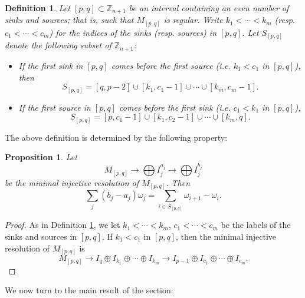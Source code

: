 \documentclass[12pt]{amsart}
\newcommand{\ZZ}{\mathbb{Z}}
\newtheorem{definition}[theorem]{Definition}
\newtheorem{proposition}[theorem]{Proposition}
\theoremstyle{remark}
\numberwithin{equation}{section}
\begin{document}
\begin{definition}\label{def:Spq}
Let $[p,q] \subset \ZZ_{n+1}$ be an interval containing an even number of sinks and sources; that is, such that $M_{[p,q]}$ is regular. Write $k_1 < \cdots < k_m$ (resp. $c_1 < \cdots < c_m$) for the indices of the sinks (resp. sources) in $[p,q]$. Let $S_{[p,q]}$ denote the following subset of $\ZZ_{n+1}$:
\begin{itemize}
\item If the first sink in $[p,q]$ comes before the first source (i.e. $k_1 < c_1$ in $[p,q]$), then 
\[
S_{[p,q]} = [q,p-2] \cup [k_1, c_1 -1] \cup \cdots \cup [k_m, c_m - 1].
\]
\item If the first source in $[p,q]$ comes before the first sink (i.e. $c_1 < k_1$ in $[p,q]$),
\[
S_{[p,q]} = [p,c_1-1] \cup [k_1,c_2-1] \cup \cdots \cup [k_m,q].
\]
\end{itemize}
\end{definition}

The above definition is determined by the following property:
\begin{proposition}
Let 
\[
M_{[p,q]} \to \bigoplus I_j^{a_j} \to \bigoplus I_j^{b_j}
\]
be the minimal injective resolution of $M_{[p,q]}$. Then
\[
\sum_j (b_j - a_j)\omega_j = \sum_{i \in S_{[p,q]}} \omega_{i+1} - \omega_i.
\]
\end{proposition}
\begin{proof}
As in Definition \ref{def:Spq}, we let $k_1 < \cdots < k_m$, $c_1 < \cdots < c_m$ be the labels of the sinks and sources in $[p,q]$. If $k_1 < c_1$ in $[p,q]$, then the minimal injective resolution of $M_{[p,q]}$ is
\[
M_{[p,q]} \to I_q \oplus I_{k_1} \oplus \cdots \oplus I_{k_m} \to I_{p-1} \oplus I_{c_1} \oplus \cdots \oplus I_{c_m}.
\]
\end{proof}

We now turn to the main result of the section:
\end{document}
